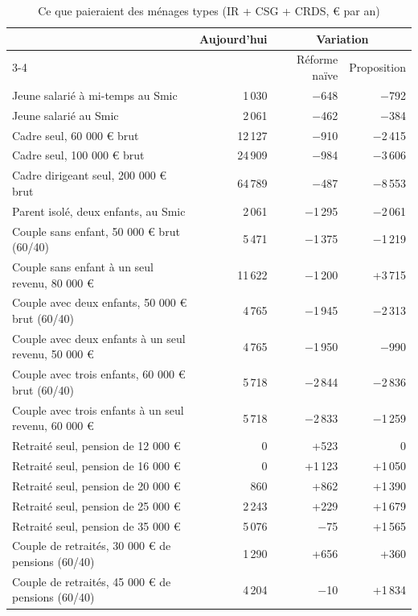 \documentclass[11pt,a4paper]{article}
\begin{document}
\begin{table}[!htbp]\centering\scriptsize\setlength{\tabcolsep}{4pt}
\caption{Ce que paieraient des ménages types (IR + CSG + CRDS, € par an)}\label{tab:ircsg_cas}
\begin{tabular}{@{}lrrr@{}}
\toprule
& Aujourd'hui & \multicolumn{2}{c}{Variation} \\ \cmidrule(l){3-4}
& & Réforme naïve & Proposition \\
\midrule
Jeune salarié à mi-temps au Smic & 1\,030 & $-$648 & $-$792 \\
Jeune salarié au Smic & 2\,061 & $-$462 & $-$384 \\
Cadre seul, 60 000 € brut & 12\,127 & $-$910 & $-$2\,415 \\
Cadre seul, 100 000 € brut & 24\,909 & $-$984 & $-$3\,606 \\
Cadre dirigeant seul, 200 000 € brut & 64\,789 & $-$487 & $-$8\,553 \\
Parent isolé, deux enfants, au Smic & 2\,061 & $-$1\,295 & $-$2\,061 \\
Couple sans enfant, 50 000 € brut (60/40) & 5\,471 & $-$1\,375 & $-$1\,219 \\
Couple sans enfant à un seul revenu, 80 000 € & 11\,622 & $-$1\,200 & +3\,715 \\
Couple avec deux enfants, 50 000 € brut (60/40) & 4\,765 & $-$1\,945 & $-$2\,313 \\
Couple avec deux enfants à un seul revenu, 50 000 € & 4\,765 & $-$1\,950 & $-$990 \\
Couple avec trois enfants, 60 000 € brut (60/40) & 5\,718 & $-$2\,844 & $-$2\,836 \\
Couple avec trois enfants à un seul revenu, 60 000 € & 5\,718 & $-$2\,833 & $-$1\,259 \\
Retraité seul, pension de 12 000 € & 0 & +523 & 0 \\
Retraité seul, pension de 16 000 € & 0 & +1\,123 & +1\,050 \\
Retraité seul, pension de 20 000 € & 860 & +862 & +1\,390 \\
Retraité seul, pension de 25 000 € & 2\,243 & +229 & +1\,679 \\
Retraité seul, pension de 35 000 € & 5\,076 & $-$75 & +1\,565 \\
Couple de retraités, 30 000 € de pensions (60/40) & 1\,290 & +656 & +360 \\
Couple de retraités, 45 000 € de pensions (60/40) & 4\,204 & $-$10 & +1\,834 \\
\bottomrule
\end{tabular}

\end{table}
\end{document}
